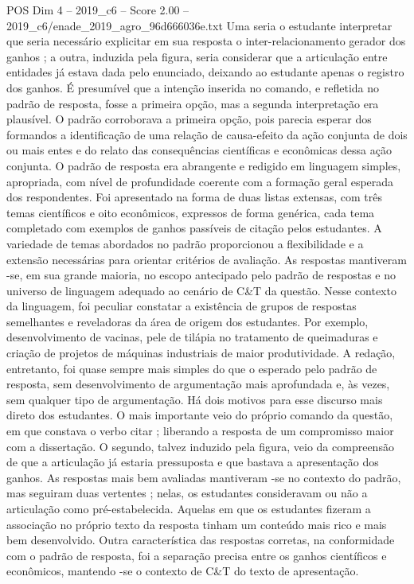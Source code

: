 \begin{textsample}{POS Dim 4 – 2019\_c6 – Score 2.00 – 2019\_c6/enade\_2019\_agro\_96d666036e.txt}
Uma seria o estudante interpretar que seria necessário explicitar em sua resposta o inter-relacionamento gerador dos ganhos ; a outra, induzida pela figura, seria considerar que a articulação entre entidades já estava dada pelo enunciado, deixando ao estudante apenas o registro dos ganhos.
É presumível que a intenção inserida no comando, e refletida no padrão de resposta, fosse a primeira opção, mas a segunda interpretação era plausível.
O padrão corroborava a primeira opção, pois parecia esperar dos formandos a identificação de uma relação de causa-efeito da ação conjunta de dois ou mais entes e do relato das consequências científicas e econômicas dessa ação conjunta.
O padrão de resposta era abrangente e redigido em linguagem simples, apropriada, com nível de profundidade coerente com a formação geral esperada dos respondentes.
Foi apresentado na forma de duas listas extensas, com três temas científicos e oito econômicos, expressos de forma genérica, cada tema completado com exemplos de ganhos passíveis de citação pelos estudantes.
A variedade de temas abordados no padrão proporcionou a flexibilidade e a extensão necessárias para orientar critérios de avaliação.
As respostas mantiveram -se, em sua grande maioria, no escopo antecipado pelo padrão de respostas e no universo de linguagem adequado ao cenário de C\&T da questão.
Nesse contexto da linguagem, foi peculiar constatar a existência de grupos de respostas semelhantes e reveladoras da área de origem dos estudantes.
Por exemplo, desenvolvimento de vacinas, pele de tilápia no tratamento de queimaduras e criação de projetos de máquinas industriais de maior produtividade.
A redação, entretanto, foi quase sempre mais simples do que o esperado pelo padrão de resposta, sem desenvolvimento de argumentação mais aprofundada e, às vezes, sem qualquer tipo de argumentação.
Há dois motivos para esse discurso mais direto dos estudantes.
O mais importante veio do próprio comando da questão, em que constava o verbo citar ; liberando a resposta de um compromisso maior com a dissertação.
O segundo, talvez induzido pela figura, veio da compreensão de que a articulação já estaria pressuposta e que bastava a apresentação dos ganhos.
As respostas mais bem avaliadas mantiveram -se no contexto do padrão, mas seguiram duas vertentes ; nelas, os estudantes consideravam ou não a articulação como pré-estabelecida.
Aquelas em que os estudantes fizeram a associação no próprio texto da resposta tinham um conteúdo mais rico e mais bem desenvolvido.
Outra característica das respostas corretas, na conformidade com o padrão de resposta, foi a separação precisa entre os ganhos científicos e econômicos, mantendo -se o contexto de C\&T do texto de apresentação.

\end{textsample}
